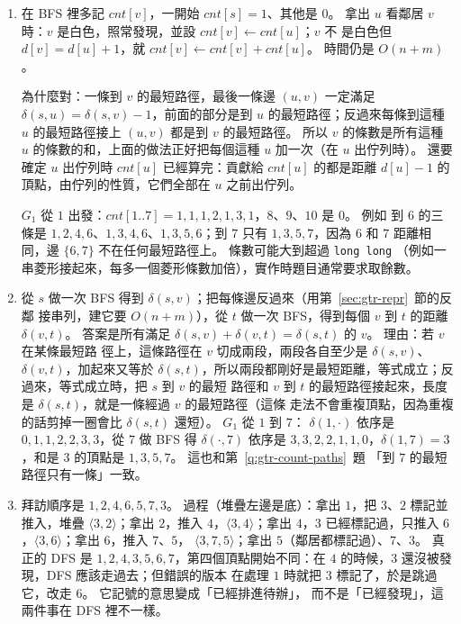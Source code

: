 \begin{enumerate}
\item 在 BFS 裡多記 $\mathit{cnt}[v]$，一開始 $\mathit{cnt}[s] = 1$、其他是 $0$。 拿出 $u$
看鄰居 $v$ 時：$v$ 是白色，照常發現，並設 $\mathit{cnt}[v] \gets \mathit{cnt}[u]$；$v$ 不
是白色但 $d[v] = d[u] + 1$，就 $\mathit{cnt}[v] \gets \mathit{cnt}[v] + \mathit{cnt}[u]$。
時間仍是 $O(n + m)$。

為什麼對：一條到 $v$ 的最短路徑，最後一條邊 $(u, v)$ 一定滿足 $\delta(s, u) = \delta(s, v)
- 1$，前面的部分是到 $u$ 的最短路徑；反過來每條到這種 $u$ 的最短路徑接上 $(u, v)$ 都是到
$v$ 的最短路徑。 所以 $v$ 的條數是所有這種 $u$ 的條數的和，上面的做法正好把每個這種 $u$
加一次（在 $u$ 出佇列時）。 還要確定 $u$ 出佇列時 $\mathit{cnt}[u]$ 已經算完：貢獻給
$\mathit{cnt}[u]$ 的都是距離 $d[u] - 1$ 的頂點，由佇列的性質，它們全部在 $u$ 之前出佇列。

$G_1$ 從 $1$ 出發：$\mathit{cnt}[1..7] = 1, 1, 1, 2, 1, 3, 1$，$8$、$9$、$10$ 是 $0$。 例如
到 $6$ 的三條是 $1, 2, 4, 6$、$1, 3, 4, 6$、$1, 3, 5, 6$；到 $7$ 只有 $1, 3, 5, 7$，因為
$6$ 和 $7$ 距離相同，邊 $\{6, 7\}$ 不在任何最短路徑上。 條數可能大到超過 \texttt{long long}
（例如一串菱形接起來，每多一個菱形條數加倍），實作時題目通常要求取餘數。

\item 從 $s$ 做一次 BFS 得到 $\delta(s, v)$；把每條邊反過來（用第~\ref{sec:gtr-repr}~節的反鄰
接串列，建它要 $O(n + m)$），從 $t$ 做一次 BFS，得到每個 $v$ 到 $t$ 的距離 $\delta(v, t)$。
答案是所有滿足 $\delta(s, v) + \delta(v, t) = \delta(s, t)$ 的 $v$。 理由：若 $v$ 在某條最短路
徑上，這條路徑在 $v$ 切成兩段，兩段各自至少是 $\delta(s, v)$、$\delta(v, t)$，加起來又等於
$\delta(s, t)$，所以兩段都剛好是最短距離，等式成立；反過來，等式成立時，把 $s$ 到 $v$ 的最短
路徑和 $v$ 到 $t$ 的最短路徑接起來，長度是 $\delta(s, t)$，就是一條經過 $v$ 的最短路徑（這條
走法不會重複頂點，因為重複的話剪掉一圈會比 $\delta(s, t)$ 還短）。 $G_1$ 從 $1$ 到 $7$：
$\delta(1, \cdot)$ 依序是 $0, 1, 1, 2, 2, 3, 3$，從 $7$ 做 BFS 得 $\delta(\cdot, 7)$ 依序是
$3, 3, 2, 2, 1, 1, 0$，$\delta(1, 7) = 3$，和是 $3$ 的頂點是 $1, 3, 5, 7$。 這也和第~\ref{q:gtr-count-paths}~題
「到 $7$ 的最短路徑只有一條」一致。

\item 拜訪順序是 $1, 2, 4, 6, 5, 7, 3$。 過程（堆疊左邊是底）：拿出 $1$，把 $3$、$2$ 標記並
推入，堆疊 $\langle 3, 2 \rangle$；拿出 $2$，推入 $4$，$\langle 3, 4 \rangle$；拿出 $4$，$3$
已經標記過，只推入 $6$，$\langle 3, 6 \rangle$；拿出 $6$，推入 $7$、$5$，
$\langle 3, 7, 5 \rangle$；拿出 $5$（鄰居都標記過）、$7$、$3$。 真正的 DFS 是 $1, 2, 4, 3,
5, 6, 7$，第四個頂點開始不同：在 $4$ 的時候，$3$ 還沒被發現，DFS 應該走過去；但錯誤的版本
在處理 $1$ 時就把 $3$ 標記了，於是跳過它，改走 $6$。 它記號的意思變成「已經排進待辦」，
而不是「已經發現」，這兩件事在 DFS 裡不一樣。


\end{enumerate}
